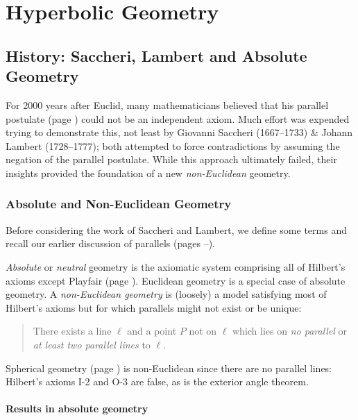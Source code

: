 \graphicspath{{4hyper/asy/}}

\section{Hyperbolic Geometry}\label{chap:hyper}

\subsection{History: Saccheri, Lambert and Absolute Geometry}\label{sec:hyp1}

For 2000 years after Euclid, many mathematicians believed that his parallel postulate (page \pageref{pg:parallelpost}) could not be an independent axiom. Much effort was expended trying to demonstrate this, not least by Giovanni Saccheri (1667--1733) \& Johann Lambert (1728--1777); both attempted to force contradictions by assuming the negation of the parallel postulate. While this approach ultimately failed, their insights provided the foundation of a new \emph{non-Euclidean} geometry.


\subsubsection*{Absolute and Non-Euclidean Geometry}

Before considering the work of Saccheri and Lambert, we define some terms and recall our earlier discussion of parallels (pages \pageref{pg:parallelexist}--\pageref{pg:pythagoras}).

\begin{defn}{}{}
	\emph{Absolute} or \emph{neutral} geometry is the axiomatic system comprising all of Hilbert's axioms except Playfair (page \pageref{pg:hilbertaxioms}). Euclidean geometry is a special case of absolute geometry.\smallbreak
	A \emph{non-Euclidean geometry} is (loosely) a model satisfying most of Hilbert's axioms but for which parallels might not exist or be unique: 
		\begin{quote}
		  There exists a line $\ell$ and a point $P$ not on $\ell$ which lies on \emph{no parallel} or \emph{at least two parallel lines} to $\ell$. 
		\end{quote}
\end{defn}

Spherical geometry (page \pageref{pg:sphere}) is non-Euclidean since there are no parallel lines: Hilbert's axioms I-2 and O-3 are false, as is the exterior angle theorem.


\paragraph{Results in absolute geometry}

